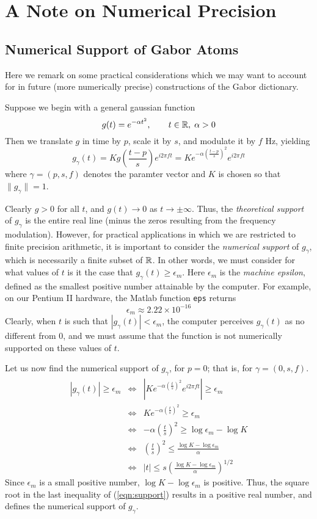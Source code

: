 \section{A Note on Numerical Precision}
\subsection{Numerical Support of Gabor Atoms}
Here we remark on some practical considerations which we may want to
account for in future (more numerically precise) constructions of the
Gabor dictionary. 

Suppose we begin with a general gaussian function
\[
g(t) = e^{-\alpha t^2}, \qquad t \in \mathbb{R},\; \alpha > 0
\]
Then we translate $g$ in time by $p$, scale it by $s$, and
modulate it by $f$ Hz, yielding 
\[
g_\gamma(t) = Kg\left(\frac{t-p}{s}\right)e^{i2\pi ft} 
= Ke^{-\alpha \left(\frac{t-p}{s}\right)^2}e^{i2\pi ft} 
\]
where $\gamma = (p,s,f)$ denotes the paramter vector and $K$ is chosen
so that $\|g_\gamma\|=1$.

Clearly $g > 0$ for all $t$, and $g(t)\rightarrow 0$ as $t\rightarrow
\pm \infty$.  Thus, the \emph{theoretical support} of %
$g_\gamma$ is the entire real line (minus the zeros resulting from
the frequency modulation). However, for practical applications in
which we are restricted to finite precision arithmetic, it is
important to consider the \emph{numerical support} of $g_\gamma$,
which is necessarily a finite subset of $\mathbb{R}$.  In other words, we must
consider for what values of $t$ is it the case that $g_\gamma(t) \geq
\epsilon_m$. Here $\epsilon_m$ is the \emph{machine epsilon}, defined 
as the smallest positive number attainable by the computer.  For
example, on our Pentium II hardware, the Matlab function {\tt eps}
returns
\[
\epsilon_m \approx  2.22 \times 10^{-16}
\]
Clearly, when $t$ is such that $|g_\gamma(t)| < \epsilon_m$, the
computer perceives $g_\gamma(t)$ as no different from 0, and we must
assume that the function is not numerically supported on these values
of $t$.

Let us now find the numerical support of $g_\gamma$, for $p = 0$; that
is, for $\gamma = (0,s,f)$.
\begin{eqnarray}
|g_\gamma(t)| \geq \epsilon_m 
&\Leftrightarrow& 
|K e^{-\alpha \left(\frac{t}{s}\right)^2}e^{i2\pi ft}| \geq
\epsilon_m \\ 
&\Leftrightarrow& 
K e^{-\alpha \left(\frac{t}{s}\right)^2} \geq \epsilon_m \\ 
&\Leftrightarrow& 
-\alpha \left(\frac{t}{s}\right)^2 
\geq \log\epsilon_m - \log K \nonumber\\ 
& \Leftrightarrow & \left(\frac{t}{s}\right)^2 \leq
\frac{\log K -\log\epsilon_m}{\alpha}\nonumber\\ 
\label{eqn:support}
& \Leftrightarrow & 
|t| \leq s\left(\frac{\log K -\log\epsilon_m}{\alpha}\right)^{1/2}
\end{eqnarray}
Since $\epsilon_m$ is a small positive number,
$\log K-\log\epsilon_m$ is positive.  Thus, the square root in
the last inequality of (\ref{eqn:support}) results in a positive real
number, and defines the numerical support of $g_\gamma$. 

